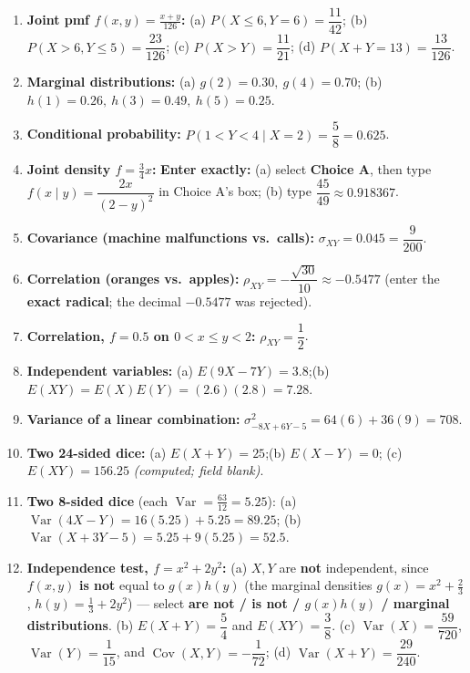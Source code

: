 \documentclass[11pt]{article}
\begin{document}
\begin{enumerate}[leftmargin=*,label=\textbf{\arabic*.}]
\item \textbf{Joint pmf $f(x,y)=\tfrac{x+y}{126}$:}
(a) $P(X\le 6,Y=6)=\dfrac{11}{42}$;\quad
(b) $P(X>6,Y\le5)=\dfrac{23}{126}$;\quad
(c) $P(X>Y)=\dfrac{11}{21}$;\quad
(d) $P(X+Y=13)=\dfrac{13}{126}$.

\item \textbf{Marginal distributions:}
(a) $g(2)=0.30,\ g(4)=0.70$;\quad
(b) $h(1)=0.26,\ h(3)=0.49,\ h(5)=0.25$.

\item \textbf{Conditional probability:}
$P(1<Y<4\mid X=2)=\dfrac58=0.625$.

\item \textbf{Joint density $f=\tfrac34 x$:}
\textbf{Enter exactly:} (a) select \textbf{Choice A}, then type
$f(x\mid y)=\dfrac{2x}{(2-y)^2}$ in Choice A's box;\quad
(b) type $\dfrac{45}{49}\approx0.918367$.

\item \textbf{Covariance (machine malfunctions vs.\ calls):}
$\sigma_{XY}=0.045=\dfrac{9}{200}$.

\item \textbf{Correlation (oranges vs.\ apples):}
$\rho_{XY}=-\dfrac{\sqrt{30}}{10}\approx-0.5477$
(enter the \textbf{exact radical}; the decimal $-0.5477$ was rejected).

\item \textbf{Correlation, $f=0.5$ on $0<x\le y<2$:}
$\rho_{XY}=\dfrac12$.

\item \textbf{Independent variables:}
(a) $E(9X-7Y)=3.8$;\quad (b) $E(XY)=E(X)E(Y)=(2.6)(2.8)=7.28$.

\item \textbf{Variance of a linear combination:}
$\sigma^2_{-8X+6Y-5}=64(6)+36(9)=708$.

\item \textbf{Two 24-sided dice:}
(a) $E(X+Y)=25$;\quad (b) $E(X-Y)=0$;\quad
(c) $E(XY)=156.25$ \textit{(computed; field blank)}.

\item \textbf{Two 8-sided dice} (each $\operatorname{Var}=\tfrac{63}{12}=5.25$):
(a) $\operatorname{Var}(4X-Y)=16(5.25)+5.25=89.25$;\quad
(b) $\operatorname{Var}(X+3Y-5)=5.25+9(5.25)=52.5$.

\item \textbf{Independence test, $f=x^2+2y^2$:}
(a) $X,Y$ are \textbf{not} independent, since $f(x,y)$ \textbf{is not} equal to
$g(x)h(y)$ (the marginal densities $g(x)=x^2+\tfrac23$, $h(y)=\tfrac13+2y^2$) ---
select \textbf{are not / is not / $g(x)h(y)$ / marginal distributions}.
\quad (b) $E(X+Y)=\dfrac54$ and $E(XY)=\dfrac38$.
\quad (c) $\operatorname{Var}(X)=\dfrac{59}{720}$,
$\operatorname{Var}(Y)=\dfrac1{15}$, and
$\operatorname{Cov}(X,Y)=-\dfrac1{72}$;\quad
(d) $\operatorname{Var}(X+Y)=\dfrac{29}{240}$.


\end{enumerate}
\end{document}

